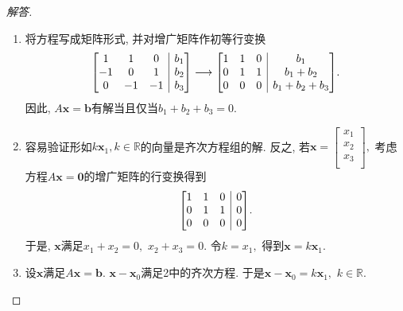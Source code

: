 \documentclass[UTF8]{ctexart}
\newcommand\bs[1]{\boldsymbol{ #1}}
\newenvironment{bmatriX}[1]{\left[\hskip -\arraycolsep \begin{array}{#1}}{\end{array}\hskip -\arraycolsep\right]}
\begin{document}
\begin{proof}[解答]
\begin{enumerate}
\item 将方程写成矩阵形式, 并对增广矩阵作初等行变换
\[
\begin{bmatriX}{ccc|c} 1 & 1 & 0 & b_1 \\ -1 & 0 & 1 & b_2 \\ 0 & -1 & -1& b_3 \end{bmatriX}
\longrightarrow
\begin{bmatriX}{ccc|c} 1 & 1 & 0 & b_1 \\ 0 & 1 & 1 & b_1+ b_2 \\ 0 & 0 & 0& b_1 + b_2 +b_3 \end{bmatriX}
.\]
因此, $A \bs x =\bs b$有解当且仅当$ b_1 + b_2 +b_3 = 0.$

\item 容易验证形如$k \bs x_1, k \in \mathbb{R}$的向量是齐次方程组的解. 反之, 若$\bs x = \begin{bmatrix} x_1 \\ x_2 \\ x_3 \\ \end{bmatrix}, $ 考虑方程$A \bs x = \bs 0$的增广矩阵的行变换得到
\[
\begin{bmatriX}{ccc|c} 1 & 1 & 0 & 0 \\ 0 & 1 & 1 & 0 \\ 0 & 0 & 0& 0 \end{bmatriX}.
\]
于是, $\bs x$满足$x_1 + x_2 = 0,$ $x_2 + x_3 = 0.$ 令$k=x_1,$ 得到$\bs x = k \bs x_1.$

\item 设$\bs x$满足$A \bs x = \bs b.$ $\bs x - \bs x_0$满足2中的齐次方程. 于是$\bs x -\bs x_0 = k\bs x_1,$ $k\in \mathbb{R}.$
\end{enumerate}
\end{proof}
\end{document}
